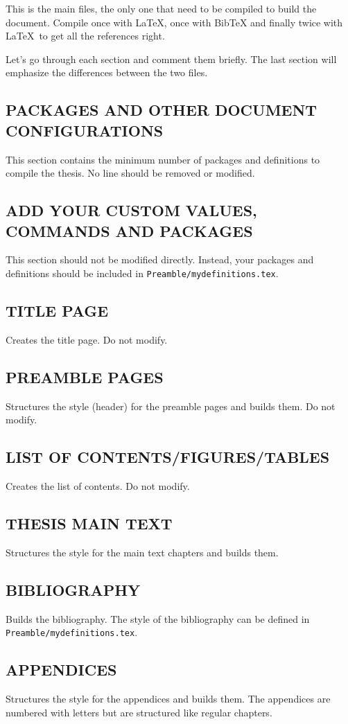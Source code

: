 This is the main files, the only one that need to be compiled to build the document. Compile once with \LaTeX, once with BibTeX and finally twice with \LaTeX\ to get all the references right.

Let's go through each section and comment them briefly. The last section will emphasize the differences between the two files.

\subsection{PACKAGES AND OTHER DOCUMENT CONFIGURATIONS}

This section contains the minimum number of packages and definitions to compile the thesis. No line should be removed or modified.

\subsection{ADD YOUR CUSTOM VALUES, COMMANDS AND PACKAGES}

This section should not be modified directly. Instead, your packages and definitions should be included in  \texttt{Preamble/mydefinitions.tex}.

\subsection{TITLE PAGE}

Creates the title page. Do not modify.

\subsection{PREAMBLE PAGES}

Structures the style (header) for the preamble pages and builds them. Do not modify.

\subsection{LIST OF CONTENTS/FIGURES/TABLES}

Creates the list of contents. Do not modify.

\subsection{THESIS MAIN TEXT}

Structures the style for the main text chapters and builds them. 

\subsection{BIBLIOGRAPHY}

Builds the bibliography. The style of the bibliography can be defined in \texttt{Preamble/mydefinitions.tex}.

\subsection{APPENDICES}

Structures the style for the appendices and builds them. The appendices are numbered with letters but are structured like regular chapters.


